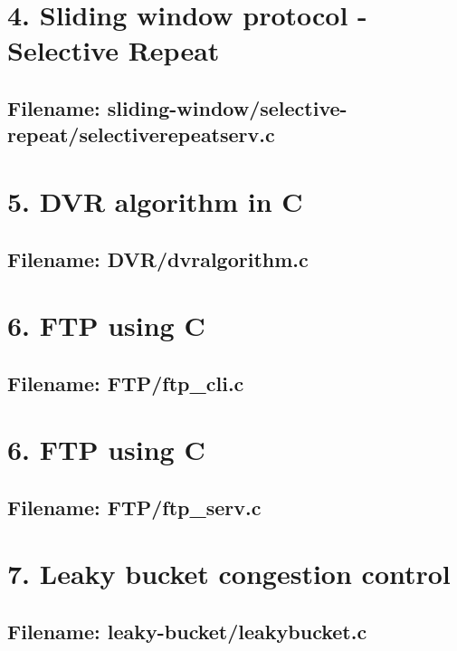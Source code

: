 \documentclass{article}
\begin{document}
\newpage
\section*{4. Sliding window protocol - Selective Repeat}
\subsection*{Filename: sliding-window/selective-repeat/selectiverepeatserv.c}


\newpage
\section*{5. DVR algorithm in C}
\subsection*{Filename: DVR/dvralgorithm.c}


\newpage
\section*{6. FTP using C}
\subsection*{Filename: FTP/ftp\_cli.c}


\newpage
\section*{6. FTP using C}
\subsection*{Filename: FTP/ftp\_serv.c}


\newpage
\section*{7. Leaky bucket congestion control}
\subsection*{Filename: leaky-bucket/leakybucket.c}

\end{document}
